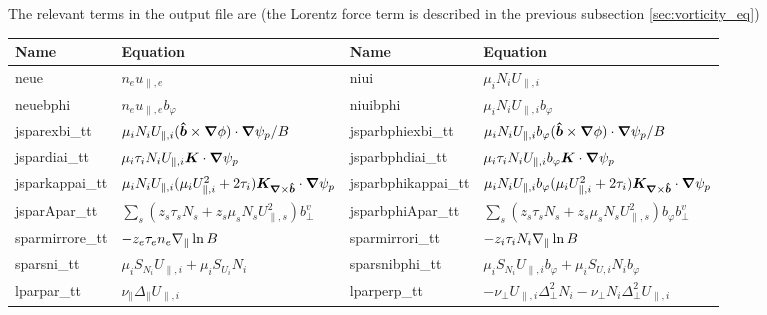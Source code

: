 The relevant terms in the output file are (the Lorentz force term is described in the previous subsection \ref{sec:vorticity_eq})
\begin{longtable}{llll}
\toprule
\rowcolor{gray!50}\textbf{Name} &  \textbf{Equation} &
\textbf{Name} &  \textbf{Equation}\\
\midrule
    neue &$n_e u_{\parallel,e}$ &
    niui &$\mu_i N_i U_{\parallel,i}$ \\
    neuebphi &$n_eu_{\parallel,e}b_\varphi$ &
    niuibphi &$\mu_i N_iU_{\parallel,i}b_\varphi$ \\
    jsparexbi\_tt       & $\mu_i N_iU_{\parallel,i}(\bm{\hat{b}}\times{\boldsymbol{\nabla}}\phi)\cdot{\boldsymbol{\nabla}} \psi_p/B$ &
    jsparbphiexbi\_tt   & $\mu_i N_iU_{\parallel,i}b_\varphi(\bm{\hat{b}}\times{\boldsymbol{\nabla}}\phi)\cdot{\boldsymbol{\nabla}} \psi_p/B$ \\
    jspardiai\_tt       & $\mu_i \tau_i N_iU_{\parallel,i}{\boldsymbol{K}}\cdot{\boldsymbol{\nabla}}\psi_p$ &
    jsparbphdiai\_tt   & $\mu_i \tau_i N_iU_{\parallel,i}b_\varphi{\boldsymbol{K}}\cdot{\boldsymbol{\nabla}}\psi_p$ \\
    jsparkappai\_tt       & $\mu_i N_iU_{\parallel,i} ( \mu_i U_{\parallel,i}^2 + 2\tau_i){\boldsymbol{K}}_{{\boldsymbol{\nabla}}\times \bm{\hat{b}}}\cdot{\boldsymbol{\nabla}}\psi_p$ &
    jsparbphikappai\_tt       & $\mu_i N_iU_{\parallel,i}b_\varphi ( \mu_i U_{\parallel,i}^2 + 2\tau_i){\boldsymbol{K}}_{{\boldsymbol{\nabla}}\times \bm{\hat{b}}}\cdot{\boldsymbol{\nabla}}\psi_p$ \\
    jsparApar\_tt       & $\sum_s (z_s \tau_s N_s + z_s \mu_s N_s U_{\parallel,s}^2)b_\perp^v$ &
    jsparbphiApar\_tt   & $\sum_s (z_s \tau_s N_s + z_s \mu_s N_s U_{\parallel,s}^2)b_\varphi b_\perp^v$ \\
    sparmirrore\_tt & $-z_e\tau_en_e\nabla_\parallel \ln B$ &
    sparmirrori\_tt & $-z_i\tau_iN_i\nabla_\parallel \ln B$ \\
    sparsni\_tt & $\mu_i S_{N_i} U_{\parallel,i} + \mu_i S_{U_i} N_i $ &
    sparsnibphi\_tt & $\mu_i S_{N_i} U_{\parallel,i}b_\varphi + \mu_i S_{U,i} N_i b_\varphi $ \\
    lparpar\_tt   & $\nu_\parallel \Delta_\parallel U_{\parallel,i}$ &
    lparperp\_tt & $-\nu_\perp U_{\parallel,i} \Delta_\perp^2 N_i - \nu_\perp N_i\Delta_\perp^2 U_{\parallel,i} $ \\
\bottomrule
\end{longtable}

